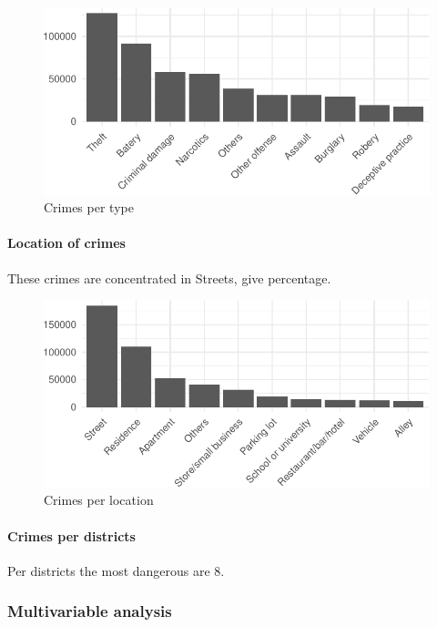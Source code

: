 \documentclass[]{article}
\let\oldparagraph\paragraph
\renewcommand{\paragraph}[1]{\oldparagraph{#1}\mbox{}}
\begin{document}
\begin{figure}[htbp]
\centering
\includegraphics{Assessment_1v6_files/figure-latex/fig6-1.pdf}
\caption{Crimes per type}
\end{figure}

\paragraph{Location of crimes}\label{location-of-crimes}

These crimes are concentrated in Streets, give percentage.

\begin{figure}[htbp]
\centering
\includegraphics{Assessment_1v6_files/figure-latex/fig7-1.pdf}
\caption{Crimes per location}
\end{figure}

\paragraph{Crimes per districts}\label{crimes-per-districts}

Per districts the most dangerous are 8.

\subsubsection{Multivariable analysis}\label{multivariable-analysis}
\end{document}
